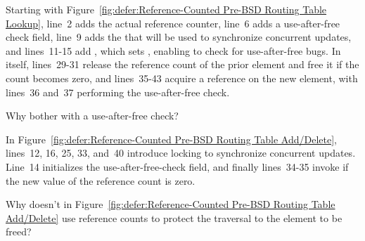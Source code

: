 Starting with
Figure~\ref{fig:defer:Reference-Counted Pre-BSD Routing Table Lookup},
line~2 adds the actual reference counter, line~6 adds a 
use-after-free check field, line~9 adds the  that will
be used to synchronize concurrent updates,
and lines~11-15 add , which sets
, enabling  to check for
use-after-free bugs.
In  itself, lines~29-31 release the reference
count of the prior element and free it if the count becomes zero,
and lines~35-43 acquire a reference on the new element, with lines~36
and~37 performing the use-after-free check.

\QuickQuiz{}
	Why bother with a use-after-free check?
 \QuickQuizEnd

In Figure~\ref{fig:defer:Reference-Counted Pre-BSD Routing Table Add/Delete},
lines~12, 16, 25, 33, and~40 introduce locking to synchronize
concurrent updates.
Line~14 initializes the  use-after-free-check field,
and finally lines~34-35 invoke  if the new value of
the reference count is zero.

\QuickQuiz{}
	Why doesn't  in
	Figure~\ref{fig:defer:Reference-Counted Pre-BSD Routing Table Add/Delete}
	use reference counts to
	protect the traversal to the element to be freed?
 \QuickQuizEnd

